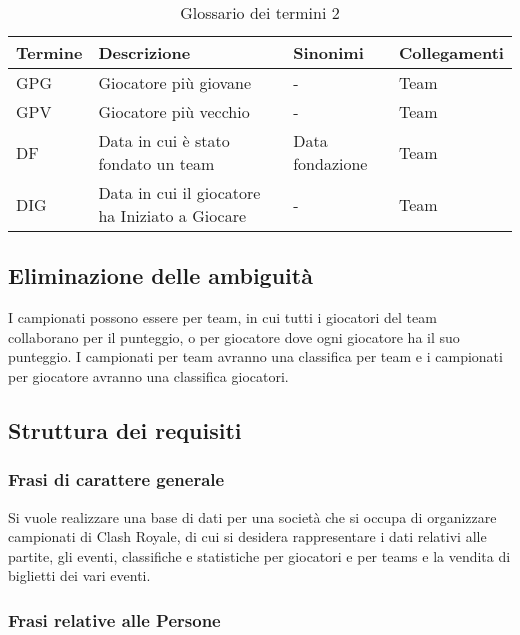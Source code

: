 \documentclass{article}
\begin{document}
\begin{table}[H]
\centering
\begin{tabularx}{\textwidth}{|l|X|l|X|}
\hline
\textbf{Termine}   & \textbf{Descrizione} & \textbf{Sinonimi} & \textbf{Collegamenti} \\ \hline
GPG & Giocatore più giovane & - & Team \\ \hline
GPV & Giocatore più vecchio & - & Team \\ \hline
DF & Data in cui è stato fondato un team & Data fondazione  & Team \\ \hline
DIG & Data in cui il giocatore ha Iniziato a Giocare & - & Team \\ \hline
\end{tabularx}
\caption{Glossario dei termini 2}
\label{table_glossario_termini2}
\end{table}


\subsection{Eliminazione delle ambiguità}

I campionati possono essere per team, in cui tutti i giocatori del team collaborano per il punteggio, o per giocatore dove ogni giocatore ha il suo punteggio. I campionati per team avranno una classifica per team e i campionati per giocatore avranno una classifica giocatori.

\subsection{Struttura dei requisiti}

\subsubsection{Frasi di carattere generale}

Si vuole realizzare una base di dati per una società che si occupa di organizzare campionati di Clash Royale, di cui si desidera rappresentare i dati relativi alle partite, gli eventi, classifiche e statistiche per giocatori e per teams e la vendita di biglietti dei vari eventi.

\subsubsection{Frasi relative alle Persone}
\end{document}
